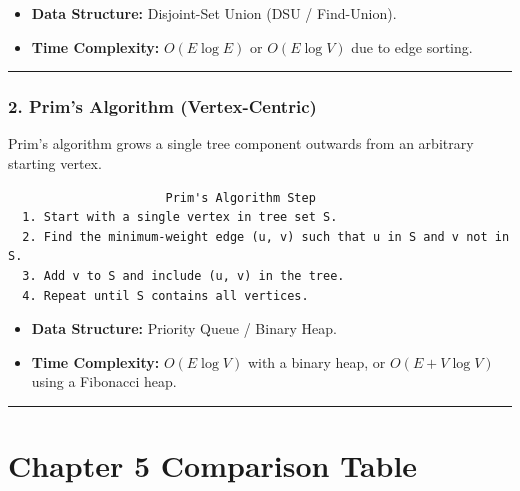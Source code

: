 \documentclass[
]{book}
\providecommand{\tightlist}{%
  \setlength{\itemsep}{0pt}\setlength{\parskip}{0pt}}
\theoremstyle{definition}
\theoremstyle{definition}
\theoremstyle{definition}
\theoremstyle{definition}
\theoremstyle{remark}
\begin{document}
\begin{itemize}
\tightlist
\item
  \textbf{Data Structure:} Disjoint-Set Union (DSU / Find-Union).
\item
  \textbf{Time Complexity:} \(O(E \log E)\) or \(O(E \log V)\) due to edge sorting.
\end{itemize}

\begin{center}\rule{0.5\linewidth}{0.5pt}\end{center}

\subsubsection{2. Prim's Algorithm (Vertex-Centric)}\label{prims-algorithm-vertex-centric}

Prim's algorithm grows a single tree component outwards from an arbitrary starting vertex.

\begin{verbatim}
                      Prim's Algorithm Step
  1. Start with a single vertex in tree set S.
  2. Find the minimum-weight edge (u, v) such that u in S and v not in S.
  3. Add v to S and include (u, v) in the tree.
  4. Repeat until S contains all vertices.
\end{verbatim}

\begin{itemize}
\tightlist
\item
  \textbf{Data Structure:} Priority Queue / Binary Heap.
\item
  \textbf{Time Complexity:} \(O(E \log V)\) with a binary heap, or \(O(E + V \log V)\) using a Fibonacci heap.
\end{itemize}

\begin{center}\rule{0.5\linewidth}{0.5pt}\end{center}

\section{Chapter 5 Comparison Table}\label{chapter-5-comparison-table}
\end{document}
